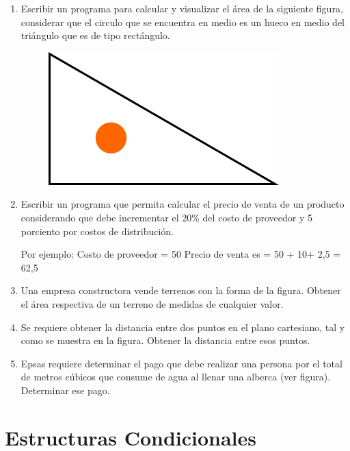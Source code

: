 \documentclass{scrartcl}
\begin{document}
\begin{enumerate}
		\item Escribir un programa para calcular y visualizar el área de la siguiente figura, considerar que el circulo que se encuentra en medio es un hueco en medio del triángulo que es de tipo rectángulo.
		
		\begin{figure}[ht]
			\centering
			\includegraphics[scale=0.3,angle=-45]{img/triangulo.png}
		\end{figure}
		
		\item Escribir un programa que permita calcular el precio de venta de un producto considerando que debe incrementar el 20\% del costo de proveedor y 5 porciento por costos de distribución. 
		
		Por ejemplo:
		Costo de proveedor = 50
		Precio de venta es = 50 + 10+ 2,5 = 62,5
		
		\item Una empresa constructora vende terrenos con la forma de la figura. Obtener el área
		respectiva de un terreno de medidas de cualquier valor.
		
		\item Se requiere obtener la distancia entre dos puntos en el plano cartesiano, tal y como se muestra en la figura. Obtener la distancia entre esos puntos.
		
		\item Epsas requiere determinar el pago que debe realizar una persona por el total de metros cúbicos que consume de agua al llenar una alberca (ver figura). Determinar ese pago.

	\end{enumerate}
		
	\section{Estructuras Condicionales}
		
\end{document}
